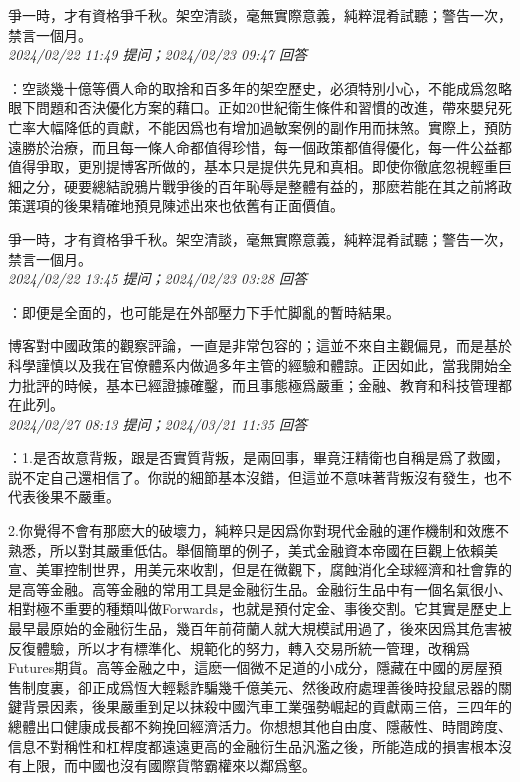 \documentclass[twocolumn]{ctexart}
\begin{document}
爭一時，才有資格爭千秋。架空清談，毫無實際意義，純粹混肴試聽；警告一次，禁言一個月。
\\

\textit{\hfill\noindent\small 2024/02/22 11:49 提问；2024/02/23 09:47 回答}

：空談幾十億等價人命的取捨和百多年的架空歷史，必須特別小心，不能成爲忽略眼下問題和否決優化方案的藉口。正如20世紀衛生條件和習慣的改進，帶來嬰兒死亡率大幅降低的貢獻，不能因爲也有增加過敏案例的副作用而抹煞。實際上，預防遠勝於治療，而且每一條人命都值得珍惜，每一個政策都值得優化，每一件公益都值得爭取，更別提博客所做的，基本只是提供先見和真相。即使你徹底忽視輕重巨細之分，硬要總結說鴉片戰爭後的百年恥辱是整體有益的，那麽若能在其之前將政策選項的後果精確地預見陳述出來也依舊有正面價值。

爭一時，才有資格爭千秋。架空清談，毫無實際意義，純粹混肴試聽；警告一次，禁言一個月。
\\

\textit{\hfill\noindent\small 2024/02/22 13:45 提问；2024/02/23 03:28 回答}

：即便是全面的，也可能是在外部壓力下手忙脚亂的暫時結果。

博客對中國政策的觀察評論，一直是非常包容的；這並不來自主觀偏見，而是基於科學謹慎以及我在官僚體系内做過多年主管的經驗和體諒。正因如此，當我開始全力批評的時候，基本已經證據確鑿，而且事態極爲嚴重；金融、教育和科技管理都在此列。
\\

\textit{\hfill\noindent\small 2024/02/27 08:13 提问；2024/03/21 11:35 回答}

：1.是否故意背叛，跟是否實質背叛，是兩回事，畢竟汪精衛也自稱是爲了救國，説不定自己還相信了。你説的細節基本沒錯，但這並不意味著背叛沒有發生，也不代表後果不嚴重。

2.你覺得不會有那麽大的破壞力，純粹只是因爲你對現代金融的運作機制和效應不熟悉，所以對其嚴重低估。舉個簡單的例子，美式金融資本帝國在巨觀上依賴美宣、美軍控制世界，用美元來收割，但是在微觀下，腐蝕消化全球經濟和社會靠的是高等金融。高等金融的常用工具是金融衍生品。金融衍生品中有一個名氣很小、相對極不重要的種類叫做Forwards，也就是預付定金、事後交割。它其實是歷史上最早最原始的金融衍生品，幾百年前荷蘭人就大規模試用過了，後來因爲其危害被反復體驗，所以才有標準化、規範化的努力，轉入交易所統一管理，改稱爲Futures期貨。高等金融之中，這麽一個微不足道的小成分，隱藏在中國的房屋預售制度裏，卻正成爲恆大輕鬆詐騙幾千億美元、然後政府處理善後時投鼠忌器的關鍵背景因素，後果嚴重到足以抹殺中國汽車工業强勢崛起的貢獻兩三倍，三四年的總體出口健康成長都不夠挽回經濟活力。你想想其他自由度、隱蔽性、時間跨度、信息不對稱性和杠桿度都遠遠更高的金融衍生品汎濫之後，所能造成的損害根本沒有上限，而中國也沒有國際貨幣霸權來以鄰爲壑。
\\
\end{document}
